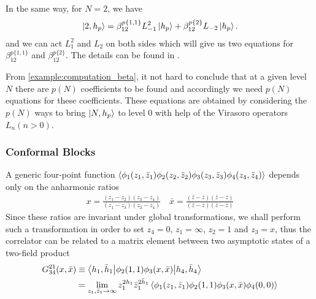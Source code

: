 \documentclass[10pt]{article}
\begin{document}
\begin{example}
    In the same way, for $N=2$, we have 
    \begin{align}
        \ket{2,h_p}=\beta^{p\{1,1\}}_{12} L^2_{-1}\ket{h_p}+\beta^{p\{2\}}_{12}L_{-2}\ket{h_p}.
    \end{align}
    and we can act $L_1^2$ and $L_2$ on both sides which will give us two equations for $\beta^{p\{1,1\}}_{12}$ and $\beta^{p\{2\}}_{12}$. 
    The details can be found in \cite{DiFrancesco:1997nk}.
\end{example}
From \cref{example:computation_beta}, it not hard to conclude that at a given level $N$ there are $p(N)$ coefficients to be found and accordingly we need $p(N)$ equations for these coefficients.
These equations are obtained by considering the $p(N)$ ways to bring $\ket{N,h_p}$ to level 0 with help of the Virasoro operators $L_n (n>0)$. 
\subsubsection{Conformal Blocks}
A generic four-point function $\expval{\phi_1(z_1,\bar{z}_1)\phi_2(z_2,\bar{z}_2)\phi_3(z_3,\bar{z}_3)\phi_4(z_4,\bar{z}_4)}$ depends only on the anharmonic ratios 
\begin{align}
    x=\frac{(z_1-z_2)(z_3-z_4)}{(z_1-z_3)(z_2-z_4)}\quad\bar{x}=\frac{(\bar{z}-\bar{z})(\bar{z}-\bar{z})}{(\bar{z}-\bar{z})(\bar{z}-\bar{z})}
\end{align}
Since these ratios are invariant under global transformations, we shall perform such a transformation in order to set $z_4=0$, $z_1=\infty$, $z_2=1$ and $z_3=x$, thus the correlator can be related to a matrix element between two asymptotic states of a two-field product
\begin{align}
    G^{21}_{34}(x,\bar{x}) & \equiv\mel**{h_1,\bar{h}_1}{\phi_2(1,1)\phi_3(x,\bar{x})}{h_4,\bar{h}_4}\notag                                                       \\
                           & =\lim_{z_1,\bar{z}_1\to\infty}z^{2h_1}_1 \bar{z}^{2\bar{h}_1}_1\expval{\phi_1(z_1,\bar{z}_1)\phi_2(1,1)\phi_3(x,\bar{x})\phi_4(0,0)}
\end{align}
\end{document}
